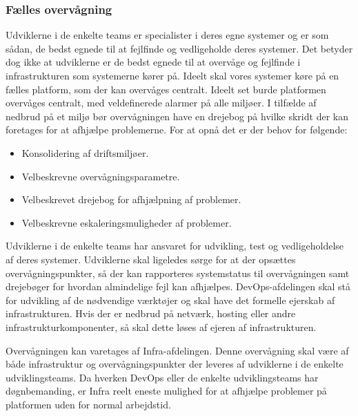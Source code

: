 \documentclass{article}
\begin{document}
\subsubsection{Fælles overvågning}
Udviklerne i de enkelte teams er specialister i deres egne systemer og er som sådan, de bedst egnede til at fejlfinde og vedligeholde deres systemer. Det betyder dog ikke at udviklerne er de bedst egnede til at overvåge og fejlfinde i infrastrukturen som systemerne kører på. Ideelt skal vores systemer køre på en fælles platform, som der kan overvåges centralt.
Ideelt set burde platformen overvåges centralt, med veldefinerede alarmer på alle miljøer. I tilfælde af nedbrud på et miljø bør overvågningen have en drejebog på hvilke skridt der kan foretages for at afhjælpe problemerne.
For at opnå det er der behov for følgende:
\begin{itemize}
\item Konsolidering af driftsmiljøer.
\item Velbeskrevne overvågningsparametre.
\item Velbeskrevet drejebog for afhjælpning af problemer.
\item Velbeskrevne eskaleringsmuligheder af problemer.
\end{itemize}

Udviklerne i de enkelte teams har ansvaret for udvikling, test og vedligeholdelse af deres systemer. Udviklerne skal ligeledes sørge for at der opsættes overvågningspunkter, så der kan rapporteres systemstatus til overvågningen samt drejebøger for hvordan almindelige fejl kan afhjælpes.
DevOps-afdelingen skal stå for udvikling af de nødvendige værktøjer og skal have det formelle ejerskab af infrastrukturen. Hvis der er nedbrud på netværk, hosting eller andre infrastrukturkomponenter, så skal dette løses af ejeren af infrastrukturen.

Overvågningen kan varetages af Infra-afdelingen. Denne overvågning skal være af både infrastruktur og overvågningspunkter der leveres af udviklerne i de enkelte udviklingsteams. Da hverken DevOps eller de enkelte udviklingsteams har døgnbemanding, er Infra reelt eneste mulighed for at afhjælpe problemer på platformen uden for normal arbejdstid.

\end{document}
